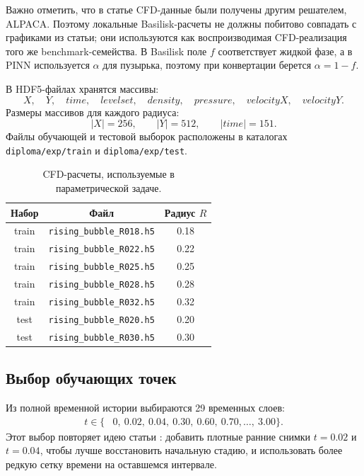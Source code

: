 \documentclass[12pt,a4paper]{article}
\begin{document}
Важно отметить, что в статье \cite{Buhendwa2021} CFD-данные были получены
другим решателем, ALPACA. Поэтому локальные Basilisk-расчеты не должны
побитово совпадать с графиками из статьи; они используются как воспроизводимая
CFD-реализация того же benchmark-семейства. В Basilisk поле \(f\) соответствует
жидкой фазе, а в PINN используется \(\alpha\) для пузырька, поэтому при
конвертации берется \(\alpha=1-f\).

В HDF5-файлах хранятся массивы:
\[
    X,\quad Y,\quad time,\quad levelset,\quad density,\quad pressure,\quad
    velocityX,\quad velocityY.
\]
Размеры массивов для каждого радиуса:
\[
    |X|=256,\qquad |Y|=512,\qquad |time|=151.
\]
Файлы обучающей и тестовой выборок расположены в каталогах
\texttt{diploma/exp/train} и \texttt{diploma/exp/test}.

\begin{table}[h]
    \centering
    \begin{tabular}{c|c|c}
        \hline
        Набор & Файл & Радиус \(R\) \\
        \hline
        train & \texttt{rising\_bubble\_R018.h5} & 0.18 \\
        train & \texttt{rising\_bubble\_R022.h5} & 0.22 \\
        train & \texttt{rising\_bubble\_R025.h5} & 0.25 \\
        train & \texttt{rising\_bubble\_R028.h5} & 0.28 \\
        train & \texttt{rising\_bubble\_R032.h5} & 0.32 \\
        test  & \texttt{rising\_bubble\_R020.h5} & 0.20 \\
        test  & \texttt{rising\_bubble\_R030.h5} & 0.30 \\
        \hline
    \end{tabular}
    \caption{CFD-расчеты, используемые в параметрической задаче.}
    \label{tab:radii}
\end{table}

\subsection{Выбор обучающих точек}

Из полной временной истории выбираются 29 временных слоев:
\[
\begin{split}
    t\in\{&
    0,\ 0.02,\ 0.04,\ 0.30,\ 0.60,\ 0.70,\ldots,\ 3.00
    \}.
\end{split}
\]
Этот выбор повторяет идею статьи \cite{Buhendwa2021}: добавить плотные ранние
снимки \(t=0.02\) и \(t=0.04\), чтобы лучше восстановить начальную стадию,
и использовать более редкую сетку времени на оставшемся интервале.
\end{document}
